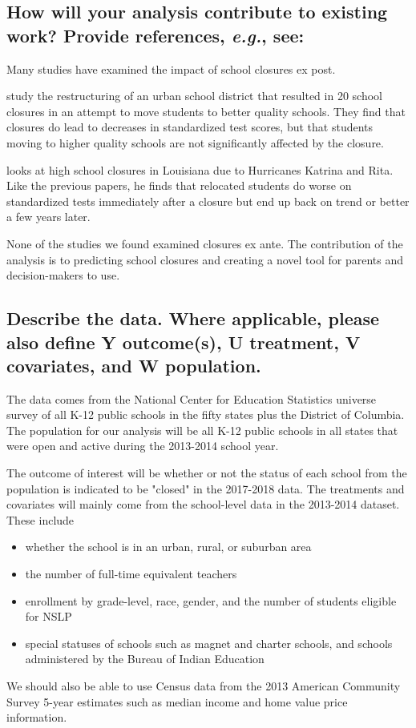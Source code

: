 \documentclass[twoside,11pt]{article}
\begin{document}
\subsection{How will your analysis contribute to existing work? Provide references, \emph{e.g.}, see: \cite{cite1,cite2}}

Many studies have examined the impact of school closures ex post.

 \cite{cite1} study the restructuring of an urban school district that resulted in 20 school closures in an attempt to move students to better quality schools. They find that closures do lead to decreases in standardized test scores, but that students moving to higher quality schools are not significantly affected by the closure. 

\cite{cite2} looks at high school closures in Louisiana due to Hurricanes Katrina and Rita. Like the previous papers, he finds that relocated students do worse on standardized tests immediately after a closure but end up back on trend or better a few years later. 

None of the studies we found examined closures ex ante. The contribution of the analysis is to predicting school closures and creating a novel tool for parents and decision-makers to use.

\subsection{Describe the data. Where applicable, please also define Y outcome(s), U treatment, V covariates, and W population.}

The data comes from the National Center for Education Statistics universe survey of all K-12 public schools in the fifty states plus the District of Columbia. The population for our analysis will be all K-12 public schools in all states that were open and active during the 2013-2014 school year. 

The outcome of interest will be whether or not the status of each school from the population is indicated to be "closed" in the 2017-2018 data.
The treatments and covariates will mainly come from the school-level data in the 2013-2014 dataset. These include 
\begin{itemize}
\item whether the school is in an urban, rural, or suburban area
\item the number of full-time equivalent teachers
\item enrollment by grade-level, race, gender, and the number of students eligible for NSLP
\item special statuses of schools such as magnet and charter schools, and schools administered by the Bureau of Indian Education
\end{itemize}
We should also be able to use Census data from the 2013 American Community Survey 5-year estimates such as median income and home value price information.
\end{document}
